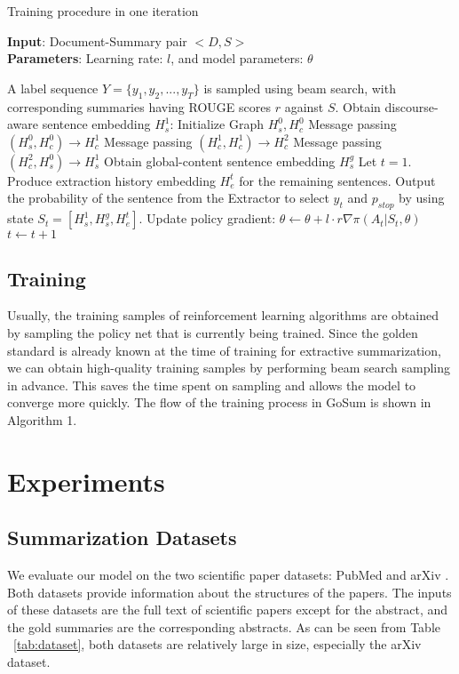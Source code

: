 \begin{algorithm}[tb]
    \caption{Training procedure in one iteration}
    \label{alg:algorithm}
    \textbf{Input}: Document-Summary pair $<D, S>$\\
    \textbf{Parameters}: Learning rate: $l$, and model parameters: $\theta$ \\
    \begin{algorithmic}[1]
        \STATE A label sequence ${Y}=\{y_1, y_2,...,y_T\}$ is sampled using beam search, with corresponding summaries having ROUGE scores $r$ against $S$.
        \STATE Obtain discourse-aware sentence embedding $H_s^1$:
        \STATE \quad Initialize Graph $H_s^0, H_c^0$
        \STATE \quad Message passing $(H_s^0, H_c^0) \rightarrow H_c^1$
        \STATE \quad Message passing $(H_c^1, H_c^1) \rightarrow H_c^2$
        \STATE \quad Message passing $(H_c^2, H_s^0) \rightarrow H_s^1$
        \STATE Obtain global-content sentence embedding $H_s^g$
        \STATE Let $t=1$.
            \STATE Produce extraction history embedding $H_e^t$ for the remaining sentences.
            \STATE Output the probability of the sentence from the Extractor to select $y_t$ and $p_{stop}$ by using state $S_t= [ H_s^1, H_s^g, H_e^t ]$.
            \STATE Update policy gradient: $\theta \leftarrow \theta + l \cdot r \nabla \pi(A_t|S_t,\theta) $
            \STATE $t \leftarrow t + 1$
        \ENDWHILE
    \end{algorithmic}
\end{algorithm}

\subsection{Training}
Usually, the training samples of reinforcement learning algorithms are obtained by sampling the policy net that is currently being trained. Since the golden standard is already known at the time of training for extractive summarization, we can obtain high-quality training samples by performing beam search sampling in advance.
This saves the time spent on sampling and allows the model to converge more quickly.
The flow of the training process in GoSum is shown in Algorithm 1.
\section{Experiments}
\label{sec:exp}

\subsection{Summarization Datasets}
We evaluate our model on the two scientific paper datasets: PubMed and arXiv  \cite{pubmedarxiv_2018}.
Both datasets provide information about the structures of the papers.
The inputs of these datasets are the full text of scientific papers except for the abstract, and the gold summaries are the corresponding abstracts.
As can be seen from Table ~\ref{tab:dataset}, both datasets are relatively large in size, especially the arXiv dataset.

